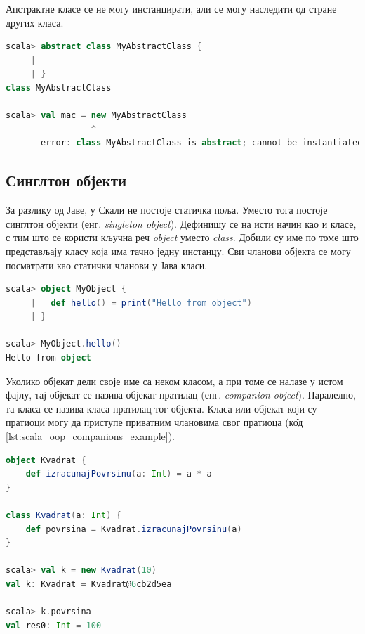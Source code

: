 \documentclass[12pt,oneside]{memoir}
\begin{document}
Апстрактне класе се не могу инстанцирати, али се могу наследити од стране других класа.

\begin{lstlisting}[language=Scala, caption={Инстанцирање апстрактне класе}, label={lst:scala_oop_abstract_class_instance_example}]
scala> abstract class MyAbstractClass {
     | 
     | }
class MyAbstractClass

scala> val mac = new MyAbstractClass
                 ^
       error: class MyAbstractClass is abstract; cannot be instantiated
\end{lstlisting}

\subsection{Синглтон објекти}
\label{subsec:scala_sing_obj}

За разлику од Јаве, у Скали не постоје статичка поља. Уместо тога постоје синглтон објекти (енг. \textit{singleton object}). Дефинишу се на исти начин као и класе, с тим што се користи кључна реч \textit{object} уместо \textit{class}. Добили су име по томе што представљају класу која има тачно једну инстанцу. Сви чланови објекта се могу посматрати као статички чланови у Јава класи. \cite{scala_prog}

\begin{lstlisting}[language=Scala, caption={Коришћење синглтон објекта}, label={lst:scala_oop_object_example}]
scala> object MyObject {
     |   def hello() = print("Hello from object")
     | }

scala> MyObject.hello()
Hello from object
\end{lstlisting}

Уколико објекат дели своје име са неком класом, а при томе се налазе у истом фајлу, тај објекат се назива објекат пратилац (енг. \textit{companion object}). Паралелно, та класа се назива класа пратилац тог објекта. Класа или објекат који су пратиоци могу да приступе приватним члановима свог пратиоца (к\^ {о}д \ref{lst:scala_oop_companions_example}). \cite{scala_prog}

\begin{lstlisting}[language=Scala, caption={Пример пратиоца}, label={lst:scala_oop_companions_example}]
object Kvadrat {
    def izracunajPovrsinu(a: Int) = a * a
}

class Kvadrat(a: Int) {
    def povrsina = Kvadrat.izracunajPovrsinu(a)
}

scala> val k = new Kvadrat(10)
val k: Kvadrat = Kvadrat@6cb2d5ea

scala> k.povrsina
val res0: Int = 100

\end{lstlisting}
\end{document}
